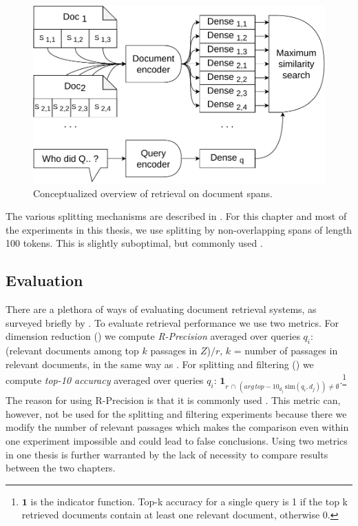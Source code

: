 \begin{figure}[ht]
    \center
    \includegraphics[width=0.7\linewidth]{img/split_concept_2.pdf}

    \caption{Conceptualized overview of retrieval on document spans.}
    \label{fig:split_concept_2}
\end{figure}

The various splitting mechanisms are described in .
For this chapter and most of the experiments in this thesis, we use splitting by non-overlapping spans of length 100 tokens.
This is slightly suboptimal, but commonly used \citep{karpukhin2020dense}.

\subsection{Evaluation}

There are a plethora of ways of evaluating document retrieval systems, as surveyed briefly by \citet{bama2015survey}.
To evaluate retrieval performance we use two metrics.
For dimension reduction () we compute \textit{R-Precision} averaged over queries $q_i$: (relevant documents among top $k$ passages in $Z$)$/r$, $k$ = number of passages in relevant documents, in the same way as \citet{petroni2021kilt}.
For splitting and filtering () we compute \textit{top-10 accuracy} averaged over queries $q_i$: $\mathbf{1}_{r\,\cap\,(arg\,top-10_{d_j}\,\text{sim}(q_i, d_j)) \neq \emptyset}$.\footnote{$\mathbf{1}$ is the indicator function. Top-k accuracy for a single query is 1 if the top k retrieved documents contain at least one relevant document, otherwise 0.}
The reason for using R-Precision is that it is commonly used \citep{sakai2007reliability,bama2015survey}.
This metric can, however, not be used for the splitting and filtering experiments because there we modify the number of relevant passages which makes the comparison even within one experiment impossible and could lead to false conclusions.
Using two metrics in one thesis is further warranted by the lack of necessity to compare results between the two chapters.

